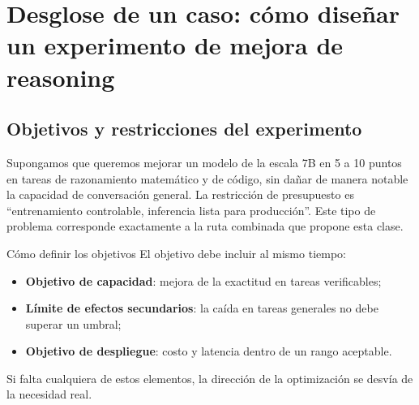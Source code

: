 \section{Desglose de un caso: cómo diseñar un experimento de mejora de reasoning}

\subsection{Objetivos y restricciones del experimento}
Supongamos que queremos mejorar un modelo de la escala 7B en 5 a 10 puntos en tareas de razonamiento matemático y de código, sin dañar de manera notable la capacidad de conversación general. La restricción de presupuesto es ``entrenamiento controlable, inferencia lista para producción''. Este tipo de problema corresponde exactamente a la ruta combinada que propone esta clase.

\begin{importantbox}{Cómo definir los objetivos}
El objetivo debe incluir al mismo tiempo:
\begin{itemize}
    \item \textbf{Objetivo de capacidad}: mejora de la exactitud en tareas verificables;
    \item \textbf{Límite de efectos secundarios}: la caída en tareas generales no debe superar un umbral;
    \item \textbf{Objetivo de despliegue}: costo y latencia dentro de un rango aceptable.
\end{itemize}
Si falta cualquiera de estos elementos, la dirección de la optimización se desvía de la necesidad real.
\end{importantbox}

